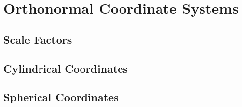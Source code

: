 \chapter{Orthonormal Coordinate Systems}\label{ch:oncoords}
\section{Scale Factors}
\section{Cylindrical Coordinates}
\section{Spherical Coordinates}
